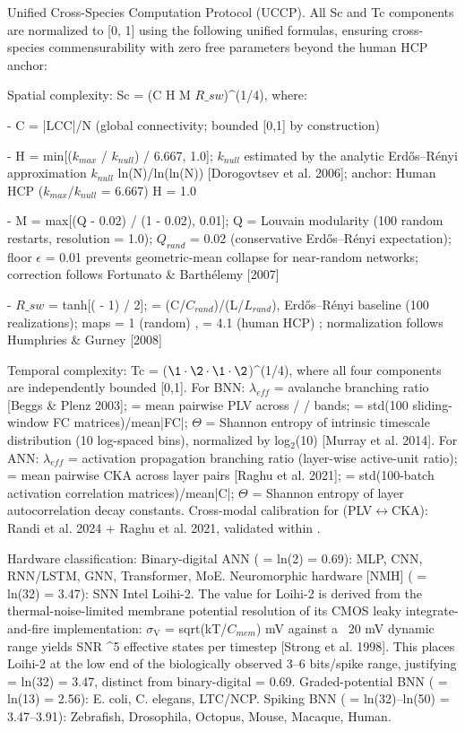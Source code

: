 \documentclass[a4paper,12pt]{article}
\providecommand{\textsubscript}[1]{\ensuremath{_{\text{#1}}}}
\begin{document}
Unified Cross-Species Computation Protocol (UCCP). All Sc and Tc components are normalized to [0, 1] using the following unified formulas, ensuring cross-species commensurability with zero free parameters beyond the human HCP anchor:

Spatial complexity: Sc = (C  \cdot  H  \cdot  M  \cdot  $R\_{sw}$)^(1/4), where:

- C = |LCC|/N (global connectivity; bounded [0,1] by construction)

- H = min[($k_{max}$ / $k_{null}$) / 6.667, 1.0]; $k_{null}$ estimated by the analytic Erd\H{o}s--R\'enyi approximation $k_{null}$  \approx  ln(N)/ln(ln(N)) [Dorogovtsev et al. 2006]; anchor: Human HCP ($k_{max}$/$k_{null}$ = 6.667)  \rightarrow  H = 1.0

- M = max[(Q - 0.02) / (1 - 0.02), 0.01]; Q = Louvain modularity (100 random restarts, resolution  \gamma  = 1.0); $Q_{rand}$ = 0.02 (conservative Erd\H{o}s--R\'enyi expectation); floor $\epsilon$ = 0.01 prevents geometric-mean collapse for near-random networks; correction follows Fortunato \& Barth\'elemy [2007]

- $R\_{sw}$ = tanh[( \sigma  - 1) / 2];  \sigma  = (C/$C_{rand}$)/(L/$L_{rand}$), Erd\H{o}s--R\'enyi baseline (100 realizations); maps  \sigma  = 1 (random)  ,  \sigma  = 4.1 (human HCP)  ; normalization follows Humphries \& Gurney [2008]

Temporal complexity: Tc = ($\1 \cdot \2 \cdot \1 \cdot \2$)^(1/4), where all four components are independently bounded [0,1].
For BNN: $\lambda_{eff}$ = avalanche branching ratio [Beggs \& Plenz 2003];  \Phi  = mean pairwise PLV across  \theta / \alpha / \gamma  bands;  \Psi  = std(100 sliding-window FC matrices)/mean|FC|; $\Theta$ = Shannon entropy of intrinsic timescale distribution (10 log-spaced bins), normalized by log\textsubscript{2}(10) [Murray et al. 2014].
For ANN: $\lambda_{eff}$ = activation propagation branching ratio (layer-wise active-unit ratio);  \Phi  = mean pairwise CKA across layer pairs [Raghu et al. 2021];  \Psi  = std(100-batch activation correlation matrices)/mean|C|; $\Theta$ = Shannon entropy of layer autocorrelation decay constants.
Cross-modal calibration for  \Phi  (PLV$\leftrightarrow$CKA): Randi et al. 2024 + Raghu et al. 2021, validated within  .

Hardware classification: Binary-digital ANN ( \alpha  = ln(2) = 0.69): MLP, CNN, RNN/LSTM, GNN, Transformer, MoE.
Neuromorphic hardware [NMH\dag] ( \alpha  = ln(32) = 3.47): SNN Intel Loihi-2.
The  \alpha  value for Loihi-2 is derived from the thermal-noise-limited membrane potential resolution of its CMOS leaky integrate-and-fire implementation: $\sigma_{\text{V}}$ = sqrt(kT/$C_{mem}$)   mV against a ~20 mV dynamic range yields SNR    ^5 effective states per timestep [Strong et al. 1998].
This places Loihi-2 at the low end of the biologically observed 3--6 bits/spike range, justifying  \alpha  = ln(32) = 3.47, distinct from binary-digital  \alpha  = 0.69.
Graded-potential BNN ( \alpha  = ln(13) = 2.56): E. coli, C. elegans, LTC/NCP.
Spiking BNN ( \alpha  = ln(32)--ln(50) = 3.47--3.91): Zebrafish, Drosophila, Octopus, Mouse, Macaque, Human.
\end{document}

